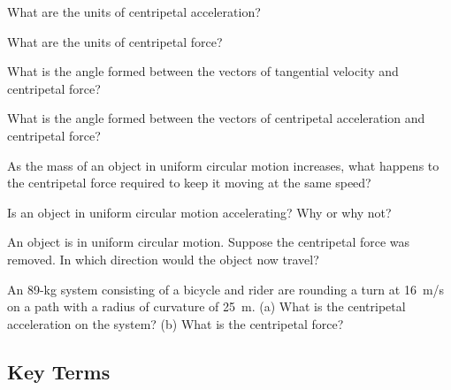 \documentclass[main-physics.tex]{subfiles}
\begin{document}
\begin{exercise} \label{TUxTQh}
    What are the units of centripetal acceleration?
\end{exercise}

\begin{exercise} \label{9YKhPo}
    What are the units of centripetal force?
\end{exercise}

\begin{exercise} \label{wS6Htw}
    What is the angle formed between the vectors of tangential velocity and centripetal force?
\end{exercise}

\begin{exercise} \label{barV9C}
    What is the angle formed between the vectors of centripetal acceleration and centripetal force?
\end{exercise}

\begin{exercise} \label{M6NkHB}
    As the mass of an object in uniform circular motion increases, what happens to the centripetal force required to keep it moving at the same speed?
\end{exercise}

\begin{exercise} \label{IAjJBC}
    Is an object in uniform circular motion accelerating? Why or why not?
\end{exercise}

\begin{exercise} \label{G8I4Up}
    An object is in uniform circular motion. Suppose the centripetal force was removed. In which direction would the object now travel?
\end{exercise}

\begin{exercise} \label{Kv8Old}
An 89-kg system consisting of a bicycle and rider are rounding a turn at \SI{16}{m/s} on a path with a radius of curvature of \SI{25}{m}. (a) What is the centripetal acceleration on the system? (b) What is the centripetal force?
\end{exercise}

\clearpage

\subsection{Key Terms}

\printnoidxglossaries


\clearpage
\end{document}

